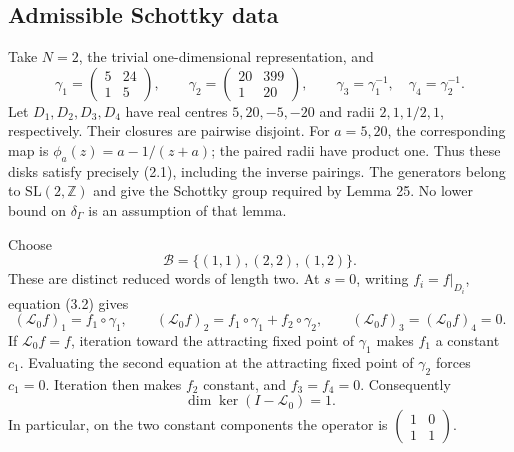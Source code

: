 \documentclass[10pt]{article}
\begin{document}
\subsection*{Admissible Schottky data}
Take \(N=2\), the trivial one-dimensional representation, and \[\gamma_1=\begin{pmatrix}5&24\\1&5\end{pmatrix},\qquad
 \gamma_2=\begin{pmatrix}20&399\\1&20\end{pmatrix},\qquad
 \gamma_3=\gamma_1^{-1},\quad\gamma_4=\gamma_2^{-1}.\] Let \(D_1,D_2,D_3,D_4\) have real centres \(5,20,-5,-20\) and radii \(2,1,1/2,1\), respectively. Their closures are pairwise disjoint. For \(a=5,20\), the corresponding map is \(\phi_a(z)=a-1/(z+a)\); the paired radii have product one. Thus these disks satisfy precisely (2.1), including the inverse pairings. The generators belong to \(\mathrm{SL}(2,\mathbb Z)\) and give the Schottky group required by Lemma 25. No lower bound on \(\delta_\Gamma\) is an assumption of that lemma.\par
Choose \[\mathcal B=\{(1,1),(2,2),(1,2)\}.\] These are distinct reduced words of length two. At \(s=0\), writing \(f_i=f|_{D_i}\), equation (3.2) gives \[(\mathcal L_0f)_1=f_1\circ\gamma_1,\qquad
 (\mathcal L_0f)_2=f_1\circ\gamma_1+f_2\circ\gamma_2,\qquad
 (\mathcal L_0f)_3=(\mathcal L_0f)_4=0.\] If \(\mathcal L_0f=f\), iteration toward the attracting fixed point of \(\gamma_1\) makes \(f_1\) a constant \(c_1\). Evaluating the second equation at the attracting fixed point of \(\gamma_2\) forces \(c_1=0\). Iteration then makes \(f_2\) constant, and \(f_3=f_4=0\). Consequently \[\dim\ker(I-\mathcal L_0)=1.\] In particular, on the two constant components the operator is \(\left(\begin{smallmatrix}1&0\\1&1\end{smallmatrix}\right)\).\par
\end{document}
